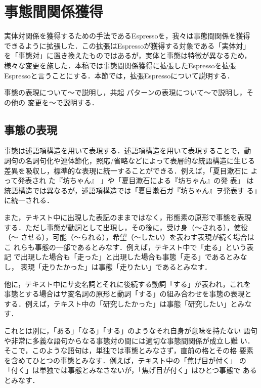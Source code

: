 \documentclass[japanese]{jnlp_1.4}
\begin{document}
\section{事態間関係獲得}
\label{sec:event_relation_acquisition}

実体対関係を獲得するための手法であるEspressoを，我々は事態間関係を獲得
できるように拡張した．この拡張はEspressoが獲得する対象である「実体対」
を「事態対」に置き換えたものではあるが，実体と事態は特徴が異なるため，
様々な変更を施した．本稿では事態間関係獲得に拡張したEspressoを拡張
Espressoと言うことにする．本節では，拡張Espressoについて説明する．

事態の表現について〜で説明し，共起
パターンの表現について〜で説明し，その他の
変更を〜で説明する．

\subsection{事態の表現}
\label{ssec:event_representation}

事態は述語項構造を用いて表現する．述語項構造を用いて表現することで，動
詞句の名詞句化や連体節化，照応/省略などによって表層的な統語構造に生じる
差異を吸収し，標準的な表現に統一することができる．例えば，「夏目漱石に
よって発表され た『坊ちゃん』 」や「夏目漱石による『坊ちゃん』の発 表」
は統語構造では異なるが，述語項構造では「夏目漱石ガ『坊ちゃん』ヲ発表す
る」に統一される．

また，テキスト中に出現した表記のままではなく，形態素の原形で事態を表現
する．ただし事態が動詞として出現し，その後に，受け身（〜される），使役（〜
させる），可能（〜られる），希望（〜したい）を表わす表現が続く場合はこ
れらも事態の一部であるとみなす．例えば，テキスト中で「走る」という表記
で出現した場合も「走った」と出現した場合も事態「走る」であるとみなし，
表現「走りたかった」は事態「走りたい」であるとみなす．

他に，テキスト中にサ変名詞とそれに後続する動詞「する」が表われ，これを
事態とする場合はサ変名詞の原形と動詞「する」の組み合わせを事態の表現と
する．例えば，テキスト中の「研究したかった」は事態「研究したい」とみな
す．

これとは別に，「ある」「なる」「する」のようなそれ自身が意味を持たない
語句や非常に多義な語句からなる事態対の間には適切な事態間関係が成立し難
い．そこで，このような語句は，単独では事態とみなさず，直前の格とその格
要素を含めてひとつの事態とみなす．例えば，テキスト中の「焦げ目が付く」
の「付く」は単独では事態とみなさないが，「焦げ目が付く」はひとつ事態で
あるとみなす．
\end{document}
